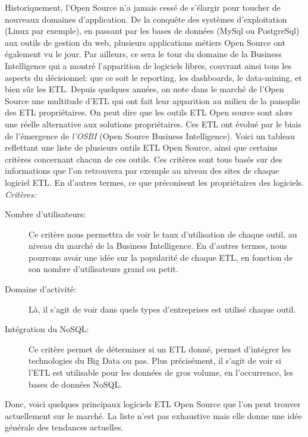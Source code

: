 \documentclass[12pt,a4wide,twoside]{report}
\begin{document}
Historiquement, l'Open Source n'a jamais cessé de s'élargir pour toucher de nouveaux domaines d'application. De la conquête des systèmes d'exploitation (Linux par exemple), en passant par les bases de données (MySql ou PostgreSql) aux outils de gestion du web, plusieurs applications métiers Open Source ont également vu le jour.\newline
Par ailleurs, ce sera le tour du domaine de la Business Intelligence qui a montré l'apparition de logiciels libres, couvrant ainsi tous les aspects du décisionnel: que ce soit le reporting, les dashboards, le data-mining, et bien sûr les ETL.
Depuis quelques années, on note dans le marché de l'Open Source une multitude d'ETL qui ont fait leur apparition au milieu de la panoplie des ETL propriétaires. On peut dire que les outils ETL Open source sont alors une réelle alternative aux solutions propriétaires. Ces ETL ont évolué par le biais de l'émergence de \emph{l'OSBI} (Open Source Business Intelligence).\newline
Voici un tableau reflettant une liste de plusieurs outils ETL Open Source, ainsi que certains critères concernant chacun de ces outils. Ces critères sont tous basés sur des informations que l'on retrouvera par exemple au niveau des sites de chaque logiciel ETL. En d'autres termes, ce que préconisent les propriétaires des logiciels.\newline 
\emph{Critères:}
\begin{description}
	\item[Nombre d'utilisateurs:]
	Ce critère nous permettra de voir le taux d'utilisation de chaque outil, au niveau du marché de la Business Intelligence. En d'autres termes, nous pourrons avoir une idée sur la popularité de chaque ETL, en fonction de son nombre d'utilisateurs grand ou petit.
	\item [Domaine d'activité:]
	Là, il s'agit de voir dans quels types d'entreprises est utilisé chaque outil.
	\item [Intégration du NoSQL:]
	Ce critère permet de déterminer si un ETL donné, permet d'intégrer les technologies du Big Data ou pas. Plus précisément, il s'agit de voir si l'ETL est utilisable pour les données de gros volume, en l'occurrence, les bases de données NoSQL.
\end{description}
Donc, voici quelques principaux logiciels ETL Open Source que l'on peut trouver actuellement sur le marché. La liste n'est pas exhaustive mais elle donne une idée générale des tendances actuelles. \newline
\end{document}
